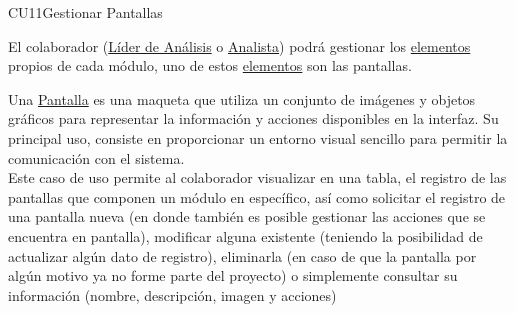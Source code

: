 	\begin{UseCase}{CU11}{Gestionar Pantallas}{
			
	El colaborador (\hyperlink{jefe}{Líder de Análisis} o \hyperlink{analista}{Analista}) podrá gestionar los \hyperlink{tElemento}{elementos} propios de cada módulo, uno de estos \hyperlink{tElemento}{elementos} son las pantallas.
	
	Una \hyperlink{pantalla}{Pantalla} es una maqueta que utiliza un conjunto de imágenes y objetos gráficos para representar la información y acciones disponibles en la interfaz. Su principal uso, consiste en proporcionar un entorno visual sencillo para permitir la comunicación con el sistema.\\
	
	Este caso de uso permite al colaborador visualizar en una tabla, el registro de las pantallas que componen un módulo en específico, así como solicitar el registro de una pantalla nueva  (en donde también es posible gestionar las acciones que se encuentra en pantalla), modificar alguna existente (teniendo la posibilidad de actualizar algún dato de registro), eliminarla (en caso de que la pantalla por algún motivo ya no forme parte del proyecto) o simplemente consultar su información (nombre, descripción, imagen y acciones) \\
	
	}
\end{UseCase}
